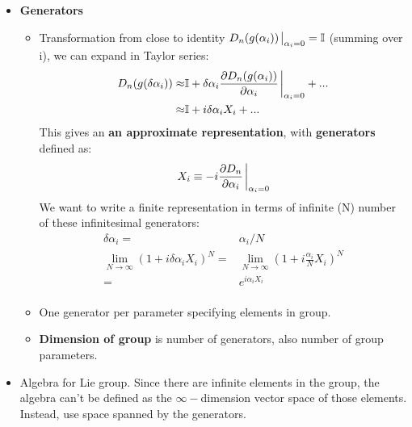 \begin{itemize}
    \item \textbf{Generators} \cite{robinson}
    \begin{itemize}
        \item Transformation from close to identity $D_n(g(\alpha_i))\eval_{\alpha_i=0}=\mathbb{I}$ (summing over i), we can expand in Taylor series: \cite{robinson}
        \begin{equation}\begin{split}
            D_n(g(\delta\alpha_i))\approx&\mathbb{I}+\delta\alpha_i\frac{\partial D_n(g(\alpha_i))}{\partial\alpha_i}\eval_{\alpha_i=0} +...\\
            \approx&\mathbb{I}+i\delta\alpha_i X_i+... \\
        \end{split}\end{equation}
        This gives an \textbf{an approximate representation}, with \textbf{generators} defined as:
        \begin{equation}\begin{split}
        X_i\equiv-i\frac{\partial D_n}{\partial\alpha_i}\eval_{\alpha_i=0} \\
        \end{split}\end{equation}
        We want to write a finite representation in terms of infinite (N) number of these infinitesimal generators:
        \begin{equation}\begin{split}
        \delta\alpha_i=&\alpha_i/N\\
        \lim_{N\to\infty}(1+i\delta\alpha_iX_i)^N=&\lim_{N\to\infty}(1+i\frac{\alpha_i}{N}X_i)^N\\
        =&e^{i\alpha_iX_i} \\
        \end{split}\end{equation}
        \item One generator per parameter specifying elements in group. \cite{robinson}
        \item \textbf{Dimension of group} is number of generators, also number of group parameters. \cite{robinson}
    \end{itemize}
    \item Algebra for Lie group. Since there are infinite elements in the group, the algebra can't be defined as the $\infty-$dimension vector space of those elements. Instead, use space spanned by the generators. \cite{robinson}

\end{itemize}
